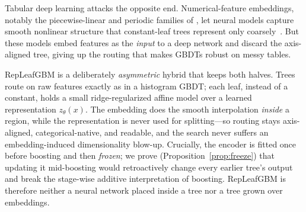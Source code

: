 \documentclass[11pt]{article}
\newcommand{\zt}{z_{\theta}}
\begin{document}
Tabular deep learning attacks the opposite end. Numerical-feature embeddings,
notably the piecewise-linear and periodic families of \citet{gorishniy2022embeddings},
let neural models capture smooth nonlinear structure that constant-leaf trees
represent only coarsely~\citep{arik2021tabnet,popov2020node,gorishniy2021revisiting}.
But these models embed features as the \emph{input} to a deep network and discard the
axis-aligned tree, giving up the routing that makes GBDTs robust on messy tables.

RepLeafGBM is a deliberately \emph{asymmetric} hybrid that keeps both halves. Trees
route on raw features exactly as in a histogram GBDT; each leaf, instead of a
constant, holds a small ridge-regularized affine model over a learned representation
$\zt(x)$. The embedding does the smooth interpolation \emph{inside} a region, while
the representation is never used for splitting---so routing stays axis-aligned,
categorical-native, and readable, and the search never suffers an embedding-induced
dimensionality blow-up. Crucially, the encoder is fitted once before boosting and
then \emph{frozen}; we prove (Proposition~\ref{prop:freeze}) that updating it
mid-boosting would retroactively change every earlier tree's output and break the
stage-wise additive interpretation of boosting. RepLeafGBM is therefore neither a
neural network placed inside a tree nor a tree grown over embeddings.
\end{document}
